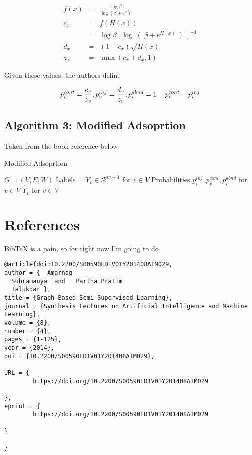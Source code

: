 \documentclass{article}
\begin{document}
\begin{eqnarray}
f(x) &=& \frac{\log \beta}{\log(\beta + e^{x})} \\ 
c_x &=& f(H(x)) \\
&=& \log \beta \left[ \log \right( \beta + e^{H(x)} \left)\right]^{-1} \\
d_x &=& (1-c_x) \sqrt{H(x)} \\
z_x &=& \max( c_x + d_x, 1)
\end{eqnarray}

Given these values, the authors define

\[
p_v^{cont} = \frac{c_v}{z_v}, \vspace{1mm} p_v^{inj} = \frac{d_v}{z_v}, \vspace{1mm} p_v^{abnd} = 1-p_v^{cont}  - p_v^{inj}
\]

\subsection{Algorithm 3: Modified Adsoprtion}

Taken from the book reference below

\begin{algorithm}
\begin{algorithmic}[1]
\caption{Modified Adsoprtion}\label{euclid}
	\State $G = (V,E,W)$
	\State Labels = $Y_v \in \mathcal{R}^{m+1}$ for $v \in V$
	\State Probabilities $p_v^{inj}, p_v^{cont}, p_v^{abnd}$ for $v \in V$
	\EndProcedure
	 	\State $\hat Y_v$ for $v \in V$
	\EndProcedure
\end{algorithmic}
\end{algorithm}


\section{References}
BibTeX is a pain, so for right now I'm going to do

\begin{verbatim}
@article{doi:10.2200/S00590ED1V01Y201408AIM029,
author = {  Amarnag 
  Subramanya  and   Partha Pratim 
  Talukdar },
title = {Graph-Based Semi-Supervised Learning},
journal = {Synthesis Lectures on Artificial Intelligence and Machine Learning},
volume = {8},
number = {4},
pages = {1-125},
year = {2014},
doi = {10.2200/S00590ED1V01Y201408AIM029},

URL = { 
        https://doi.org/10.2200/S00590ED1V01Y201408AIM029
    
},
eprint = { 
        https://doi.org/10.2200/S00590ED1V01Y201408AIM029
    
}

}
\end{verbatim}
\end{document}
